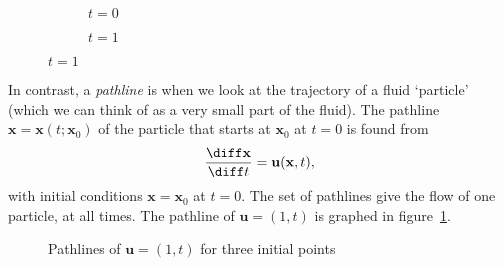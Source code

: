 \documentclass[12pt]{article}
\begin{document}
\begin{figure}[h]
\centering
\caption{Streamlines of $\mathbf{u} = (1, t)$ for different $t$}
\label{fig:streamlines_1_t}
\begin{subfigure}{0.5\textwidth}
	\centering
  \caption{$t = 0$}
\end{subfigure}%
\begin{subfigure}{0.5\textwidth}
	\centering
	\caption{$t = 1$}
\end{subfigure}
\end{figure}

In contrast, a \emph{pathline} is when we look at the trajectory of a fluid `particle' (which we can think of as a very small part of the fluid). The pathline $\mathbf{x} = \mathbf{x}(t; \mathbf{x}_0)$ of the particle that starts at $\mathbf{x}_0$ at $t = 0$ is found from
\[
\frac{\diff \mathbf{x}}{\diff t} = \mathbf{u}(\mathbf{x}, t)
,\]
with initial conditions $\mathbf{x} = \mathbf{x}_0$ at $t = 0$. The set of pathlines give the flow of one particle, at all times. The pathline of $\mathbf{u} = (1, t)$ is graphed in figure~\ref{fig:pathlines_1_t}.

\begin{figure}[h]
	\centering
	\caption{Pathlines of $\mathbf{u} = (1,t)$ for three initial points}
	\label{fig:pathlines_1_t}
\end{figure}
\end{document}
